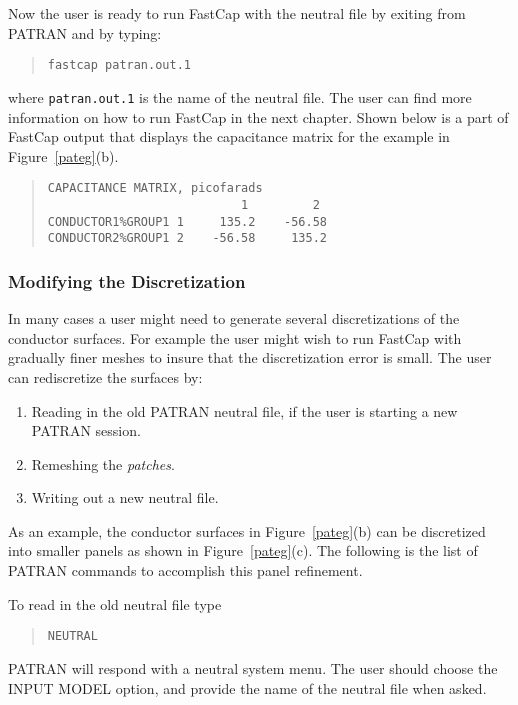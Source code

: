 Now the user is ready to run FastCap with the neutral file by exiting
from PATRAN and by typing:
\begin{quote}
\begin{verbatim}
fastcap patran.out.1
\end{verbatim}
\end{quote}
where {\tt patran.out.1} is the name of the neutral file.  The user
can find more information on how to run FastCap in the next chapter.
Shown below is a part of FastCap output that displays the capacitance
matrix for the example in Figure~\ref{pateg}(b).
\begin{quote}
\begin{verbatim}
CAPACITANCE MATRIX, picofarads
                           1         2 
CONDUCTOR1%GROUP1 1     135.2    -56.58
CONDUCTOR2%GROUP1 2    -56.58     135.2
\end{verbatim}
\end{quote}

\subsubsection{Modifying the Discretization}

In many cases a user might need to generate several discretizations of
the conductor surfaces.  For example the user might wish to run
FastCap with gradually finer meshes to insure that the discretization
error is small.  The user can rediscretize the surfaces by:  
\begin{enumerate}
\item
Reading in the old PATRAN neutral file, if the user is starting a
new PATRAN session.
\item
Remeshing the {\em patches}.
\item
Writing out a new neutral file.
\end{enumerate}

As an example, the conductor surfaces in Figure~\ref{pateg}(b) can be
discretized into smaller panels as shown in Figure~\ref{pateg}(c).
The following is the list of PATRAN commands to accomplish this panel
refinement. 

To read in the old neutral file type
\begin{quote}
\begin{verbatim}
NEUTRAL
\end{verbatim}
\end{quote}
PATRAN will respond with a neutral system menu.  The user should
choose the INPUT MODEL option, and provide the name of the neutral
file when asked.

